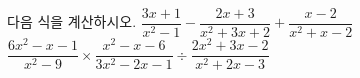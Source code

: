 다음 식을 계산하시오.
 $\dfrac{3x+1}{x^2-1}-\dfrac{2x+3}{x^2+3x+2}+\dfrac{x-2}{x^2+x-2}$
 $\dfrac{6x^2-x-1}{x^2-9}\times\dfrac{x^2-x-6}{3x^2-2x-1}\div\dfrac{2x^2+3x-2}{x^2+2x-3}$
